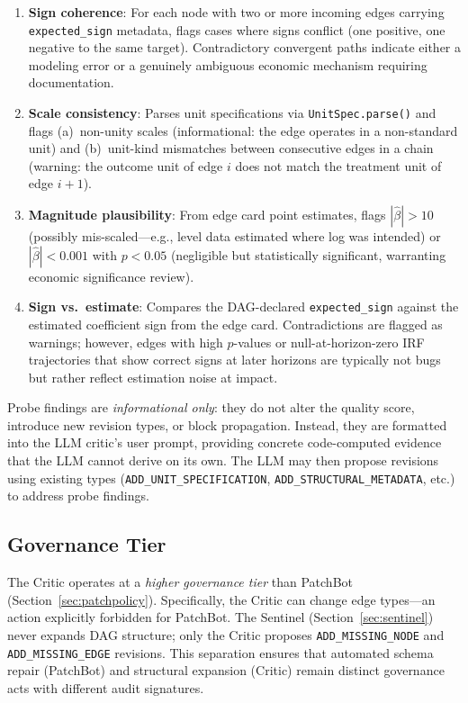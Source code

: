 \documentclass{article}
\begin{document}
\begin{enumerate}[leftmargin=*, itemsep=1pt]
    \item \textbf{Sign coherence}: For each node with two or more incoming edges carrying \texttt{expected\_sign} metadata, flags cases where signs conflict (one positive, one negative to the same target). Contradictory convergent paths indicate either a modeling error or a genuinely ambiguous economic mechanism requiring documentation.

    \item \textbf{Scale consistency}: Parses unit specifications via \texttt{UnitSpec.parse()} and flags (a)~non-unity scales (informational: the edge operates in a non-standard unit) and (b)~unit-kind mismatches between consecutive edges in a chain (warning: the outcome unit of edge $i$ does not match the treatment unit of edge $i+1$).

    \item \textbf{Magnitude plausibility}: From edge card point estimates, flags $|\hat{\beta}| > 10$ (possibly mis-scaled---e.g., level data estimated where log was intended) or $|\hat{\beta}| < 0.001$ with $p < 0.05$ (negligible but statistically significant, warranting economic significance review).

    \item \textbf{Sign vs.\ estimate}: Compares the DAG-declared \texttt{expected\_sign} against the estimated coefficient sign from the edge card. Contradictions are flagged as warnings; however, edges with high $p$-values or null-at-horizon-zero IRF trajectories that show correct signs at later horizons are typically not bugs but rather reflect estimation noise at impact.
\end{enumerate}

Probe findings are \emph{informational only}: they do not alter the quality score, introduce new revision types, or block propagation. Instead, they are formatted into the LLM critic's user prompt, providing concrete code-computed evidence that the LLM cannot derive on its own. The LLM may then propose revisions using existing types (\texttt{ADD\_UNIT\_SPECIFICATION}, \texttt{ADD\_STRUCTURAL\_METADATA}, etc.) to address probe findings.

\subsection{Governance Tier}

The Critic operates at a \emph{higher governance tier} than PatchBot (Section~\ref{sec:patchpolicy}). Specifically, the Critic can change edge types---an action explicitly forbidden for PatchBot. The Sentinel (Section~\ref{sec:sentinel}) never expands DAG structure; only the Critic proposes \texttt{ADD\_MISSING\_NODE} and \texttt{ADD\_MISSING\_EDGE} revisions. This separation ensures that automated schema repair (PatchBot) and structural expansion (Critic) remain distinct governance acts with different audit signatures.
\end{document}
